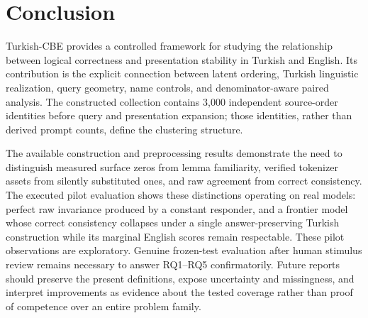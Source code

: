 \section{Conclusion}

Turkish-CBE provides a controlled framework for studying the relationship between logical correctness and
presentation stability in Turkish and English. Its contribution is the explicit connection between latent
ordering, Turkish linguistic realization, query geometry, name controls, and denominator-aware paired
analysis. The constructed collection contains 3,000 independent source-order identities before query and
presentation expansion; those identities, rather than derived prompt counts, define the clustering
structure.

The available construction and preprocessing results demonstrate the need to distinguish measured surface
zeros from lemma familiarity, verified tokenizer assets from silently substituted ones, and raw agreement
from correct consistency. The executed pilot evaluation shows these distinctions operating on real models: perfect raw
invariance produced by a constant responder, and a frontier model whose correct consistency collapses under
a single answer-preserving Turkish construction while its marginal English scores remain respectable. These
pilot observations are exploratory. Genuine frozen-test evaluation after human stimulus review remains
necessary to answer RQ1--RQ5 confirmatorily. Future reports should preserve the present definitions, expose
uncertainty and missingness, and interpret improvements as evidence about the tested coverage rather than
proof of competence over an entire problem family.
